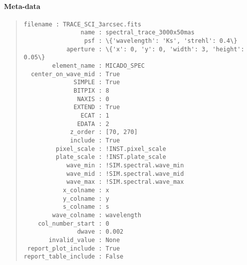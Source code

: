 \paragraph{Meta-data%
  \label{id2}%
}

\begin{quote}
\begin{alltt}
\begin{lstlisting}[frame=single]
            filename : TRACE_SCI_3arcsec.fits
                name : spectral_trace_3000x50mas
                 psf : \{'wavelength': 'Ks', 'strehl': 0.4\}
            aperture : \{'x': 0, 'y': 0, 'width': 3, 'height': 0.05\}
        element_name : MICADO_SPEC
  center_on_wave_mid : True
              SIMPLE : True
              BITPIX : 8
               NAXIS : 0
              EXTEND : True
                ECAT : 1
               EDATA : 2
             z_order : [70, 270]
             include : True
         pixel_scale : !INST.pixel_scale
         plate_scale : !INST.plate_scale
            wave_min : !SIM.spectral.wave_min
            wave_mid : !SIM.spectral.wave_mid
            wave_max : !SIM.spectral.wave_max
           x_colname : x
           y_colname : y
           s_colname : s
        wave_colname : wavelength
    col_number_start : 0
               dwave : 0.002
       invalid_value : None
 report_plot_include : True
report_table_include : False
\end{lstlisting}
\end{alltt}
\end{quote}
